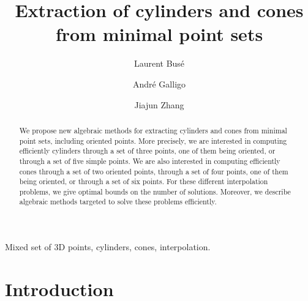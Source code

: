 \documentclass[5p]{elsarticle}
\newcommand{\com}[1]{{\color{black} #1}}
\begin{document}
	
	
\begin{frontmatter}


\title{Extraction of cylinders and cones from minimal point sets}


\author[1]{Laurent Bus\'e}
\author[1,2]{Andr\'e Galligo}
\author[1,3]{Jiajun Zhang}
\address[1]{INRIA Sophia Antipolis - M\'editerann\'ee}
\address[2]{Laboratoire J.-A. Dieudonn\'e, Universit\'e de Nice Sophia Antipolis}
\address[3]{\'Ecole Polytechnique de l'Universit\'e de Nice Sophia Antipolis}
\begin{abstract}
We propose new algebraic methods for extracting cylinders and cones from minimal point sets, including oriented points. More precisely, we are interested in computing efficiently cylinders through a set of three points, one of them being oriented, or through a set of five simple points. We are also interested in computing efficiently cones through a set of two oriented points, through a set of four points, one of them being oriented,  or through a set of six points. For these different interpolation problems, we give optimal bounds on the number of solutions. Moreover, we describe algebraic methods targeted \com{to solve these problems efficiently}.
\end{abstract}

\begin{keyword}
Mixed set of 3D points, cylinders, cones, interpolation.
\end{keyword}	

\end{frontmatter}


\section{Introduction}
\end{document}
